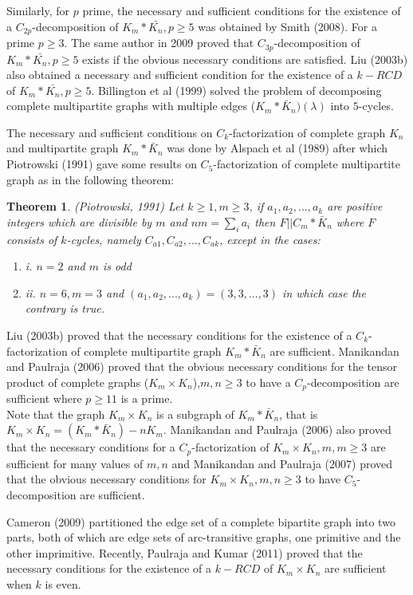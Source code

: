 \documentclass[12pt]{report}
\newcommand{\ben}{\begin{enumerate}}
\newcommand{\een}{\end{enumerate}}
\newtheorem{thm}{Theorem}[section]
\begin{document}
Similarly, for $p$ prime, the necessary and sufficient conditions
for the existence of a $C_{2p}$-decomposition of
$K_m*\bar{K_n},p\geq 5$ was obtained by Smith (2008). %
For a prime $p\geq 3$. The same author in 2009 proved that
$C_{3p}$-decomposition of $K_m*\bar{K_n},p\geq 5$ exists if the
obvious necessary conditions are satisfied. Liu (2003b) %
also obtained a necessary and sufficient condition for the existence
of a $k-RCD$ of $K_m*\bar{K_n},p\geq 5$. Billington  et al
(1999) %
solved the problem of decomposing complete multipartite graphs with
multiple edges  ($K_m*\bar K_n)(\lambda)$ into $5$-cycles.

 The necessary and sufficient conditions  on $C_k$-factorization of complete graph $K_n$ and multipartite graph $K_m*\bar K_n$ was done by Alspach  et al (1989) after which Piotrowski (1991) %
gave some results on $C_5$-factorization of complete multipartite
graph as in the following theorem:
\begin{thm}(Piotrowski, 1991)
Let $k\geq 1,m\geq 3$, if $a_1,a_2,...,a_k$ are positive integers
which are divisible by $m$ and $nm=\sum _ia_i$ then $F||C_m*\bar
K_n$ where $F$ consists of $k$-cycles, namely
$C_{a1},C_{a2},...,C_{ak}$, except in the cases: \ben
\item[i.] $n=2$ and $m$ is odd
\item[ii.] $n=6,m=3$ and $(a_1,a_2,...,a_k)=(3,3,...,3)$ in which case the contrary is true.
\een
\end{thm}
Liu (2003b) %
 proved that the necessary conditions for
the existence of a $C_k$-factorization of complete multipartite
graph $K_m*\bar K_n$ are sufficient.
Manikandan and Paulraja (2006) %
 proved that the obvious necessary conditions for the tensor product of complete graphs ($K_m\times K_n$),$m,n\geq 3$ to have a $C_p$-decomposition are sufficient where $p\geq 11$ is a prime.\\

 Note that the graph $K_m\times K_n$ is a subgraph of $K_m*\bar K_n$, that is $K_m\times K_n=(K_m*\bar K_n) - nK_m$.
 Manikandan and Paulraja (2006) %
  also proved that the necessary conditions for a $C_p$-factorization of $K_m\times K_n,m,m\geq 3$ are sufficient  for many values of $m,n$ and
 Manikandan and Paulraja (2007) %
 proved that the obvious necessary conditions for $K_m\times K_n,m,n\geq 3$ to have $C_5$-decomposition are  sufficient.

 Cameron (2009) %
  partitioned the edge set of a complete bipartite graph into two parts, both of which are edge sets of arc-transitive graphs, one primitive and the other imprimitive.
 Recently, Paulraja and Kumar (2011) %
  proved that the necessary conditions for the existence of a $k-RCD$ of $K_m\times K_n$ are sufficient when $k$ is even.
\end{document}
